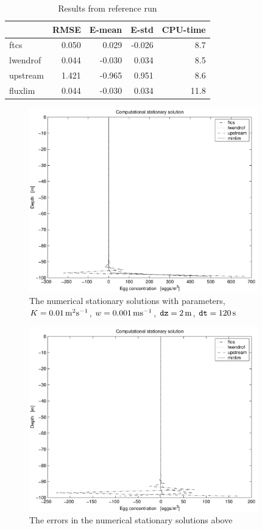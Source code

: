 \begin{table}[h]
\begin{center}
\begin{tabular}{||l|r|r|r|r||}
\hline
    &  RMSE  & E-mean & E-std & CPU-time \\
\hline
ftcs     & 0.050 &  0.029 & -0.026 &  8.7  \\
lwendrof & 0.044 & -0.030 &  0.034 &  8.5  \\
upstream & 1.421 & -0.965 &  0.951 &  8.6  \\
fluxlim  & 0.044 & -0.030 &  0.034 & 11.8  \\
\hline
\end{tabular}
\end{center}
\caption{Results from reference run}\label{tab:ex3a}
\end{table}

\begin{figure}
\begin{center}
\includegraphics[height=8cm]{ex3a}
\end{center}
\caption{The numerical stationary solutions with parameters,
     $K = 0.01 \, \mbox{m}^2 \mbox{s}^{-1}$, $w = 0.001 \, \mbox{m} \mbox{s}^{-1}$, ${\mbox{\texttt{dz}}} = 2\, \mbox{m}$, 
     ${\mbox{\texttt{dt}}} = 120\, \mbox{s}$}\label{fig:ex3a}
\end{figure}

\begin{figure}
\begin{center}
\includegraphics[height=8cm]{ex3b}
\end{center}
\caption{The errors in the numerical stationary
         solutions above}\label{fig:ex3b}
\end{figure}


